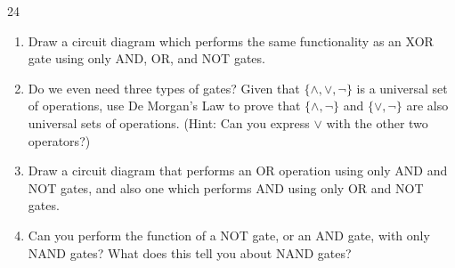 \documentclass[11pt]{article}
\begin{document}
\begin{exercise}{24}
\begin{enumerate}[label=(\alph*)]
        \item Draw a circuit diagram which performs the same
            functionality as an XOR gate using only AND, OR, and NOT
            gates.

        \item Do we even need three types of gates? Given that
            $\{\wedge, \vee, \neg\}$ is a universal set of operations,
            use De Morgan's Law to prove that $\{\wedge, \neg\}$ and
            $\{\vee, \neg\}$ are also universal sets of operations.
            (Hint: Can you express $\vee$ with the other two
            operators?)

        \item Draw a circuit diagram that performs an OR operation
            using only AND and NOT gates, and also one which performs
            AND using only OR and NOT gates.

        \item Can you perform the function of a NOT gate, or an AND
            gate, with only NAND gates? What does this tell you about
            NAND gates?
    \end{enumerate}
\end{exercise}
\end{document}
